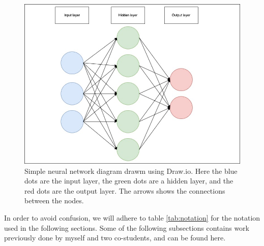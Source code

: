 \begin{figure}[H]
    \includegraphics[width=\linewidth]{Figures/Machinelearning/nn_diagram.jpeg}
    \caption[Simple diagram of a neural network]{Simple neural network diagram drawm using Draw.io. Here the blue dots are the input layer, the green dots are a hidden layer, 
    and the red dots are the output layer. The arrows shows the connections between the nodes. }
    \label{fig:nndiagram}
\end{figure}

In order to avoid confusion, we will adhere to table \ref{tab:notation} for the notation used in the following sections.
Some of the following subsections contains work previously done by myself and two co-students, and can be found here\cite{FYSSTK}.

